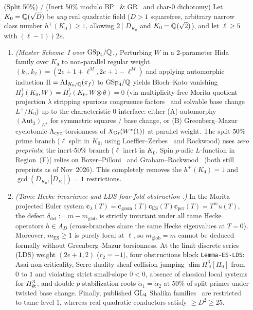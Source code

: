 \begin{theorem}\label{thm:5:rq-count1}
\tagProved{} \textup{(Split 50\%)} / \tagMod{} \textup{(Inert 50\% modulo BP~\cite{BP2021} \& GR~\cite{GR2024} and char-0 dichotomy)}
Let $K_0 = \mathbb{Q}(\sqrt{D})$ be \emph{any} real quadratic field ($D > 1$ squarefree, arbitrary narrow class number $h^+(K_0) \ge 1$, allowing $2 \mid D_{K_0}$ and $K_0 = \mathbb{Q}(\sqrt{2})$), and let $\ell \ge 5$ with $(\ell-1)\nmid 2e$.
\begin{enumerate}[label=\textup{(\roman*)}]
\item \emph{(Master Scheme~I over $\mathrm{GSp}_4/\mathbb{Q}$.)} Perturbing $W$ in a $2$-parameter Hida family over $K_0$ to non-parallel regular weight $(k_1, k_2) = (2e+1+\ell^M, 2e+1-\ell^M)$ and applying automorphic induction $\Pi = \mathrm{AI}_{K_0/\mathbb{Q}}(\pi_f)$ to $\mathrm{GSp}_4/\mathbb{Q}$ yields Bloch--Kato vanishing $H^1_f(K_0, W) = H^1_f(K_0, W\otimes\theta) = 0$ (via multiplicity-free Morita quotient projection $\lambda$ stripping spurious congruence factors~\cite{D02} and solvable base change $L^+/K_0$) up to the characteristic-$0$ interface: either \textup{(A)} automorphy $(\mathrm{Aut}_3)_{L^+}$ for symmetric squares / base change, or \textup{(B)} Greenberg--Mazur cyclotomic $\Lambda_{\mathrm{cyc}}$-torsionness of $X_{\mathrm{Gr}}(W^*(1))$ at parallel weight. The split-$50\%$ prime branch ($\ell$ split in $K_0$, using Loeffler--Zerbes~\cite{LZ2026} and Rockwood) uses \emph{zero preprints}; the inert-$50\%$ branch ($\ell$ inert in $K_0$, Spin $p$-adic $L$-function in Region~(F)) relies on Boxer--Pilloni~\cite{BP2021} and Graham--Rockwood~\cite{GR2024} (both still preprints as of Nov~2026). This completely removes the $h^+(K_0)=1$ and $\gcd(D_{K_0}, |D_{E_0}|)=1$ restrictions.
\item \emph{(Tame Hecke invariance and LDS four-fold obstruction \tagProved{}.)} In the Morita-projected Euler system $\mathbf{c}_\lambda(T) = \mathbf{c}_{\mathrm{geom}}(T)\mathbf{c}_{\mathrm{ES}}(T)\mathbf{c}_{\mathrm{per}}(T) = T^m u(T)$, the defect $\delta_{\mathrm{def}} := m - m_{\mathrm{glob}}$ is strictly invariant under all tame Hecke operators $h \in A_D$ (cross-branches share the same Hecke eigenvalues at $T=0$). Moreover, $m_{\mathrm{ES}} \ge 1$ is purely local at $\ell$, so $m_{\mathrm{glob}} = m$ cannot be deduced formally without Greenberg--Mazur torsionness. At the limit discrete series (LDS) weight $(2e+1, 2)$ ($r_2 = -1$), four obstructions block \texttt{Lemma-ES-LDS}: Asai non-criticality, Serre-duality sheaf collision jumping $\dim H^3_{\mathrm{cl}}[\Pi_0]$ from $0$ to $1$ and violating strict small-slope $0 < 0$, absence of classical local systems for $H^3_{\mathrm{\acute{e}t}}$, and double $p$-stabilization roots $\tilde\alpha_1 = \tilde\alpha_2$ at $50\%$ of split primes under twisted base change. Finally, published $\mathrm{GL}_4$ Shalika families~\cite{BDGJW2025,BDW2026} are restricted to tame level $1$, whereas real quadratic conductors satisfy $\ge D^2 \ge 25$.
\end{enumerate}
\end{theorem}

